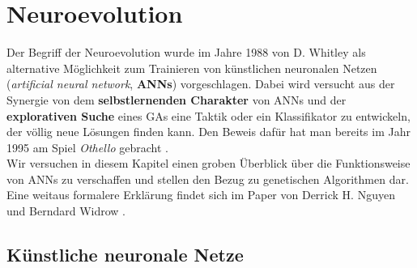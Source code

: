    \section{Neuroevolution} \label{neural-evo-definition}
        Der Begriff der Neuroevolution wurde im Jahre 1988 von D. Whitley \cite{whitley88} als alternative Möglichkeit zum Trainieren von künstlichen neuronalen Netzen (\textit{artificial neural network}, \textbf{ANNs}) vorgeschlagen. Dabei wird versucht aus der Synergie von dem \textbf{selbstlernenden Charakter} von ANNs und der \textbf{explorativen Suche} eines GAs eine Taktik oder ein Klassifikator zu entwickeln, der völlig neue Lösungen finden kann. Den Beweis dafür hat man bereits im Jahr 1995 am Spiel \textit{Othello} gebracht \cite{othello95}. \\[2mm]
        \noindent
        Wir versuchen in diesem Kapitel einen groben Überblick über die Funktionsweise von ANNs zu verschaffen und stellen den Bezug zu genetischen Algorithmen dar. Eine weitaus formalere Erklärung findet sich im Paper von Derrick H. Nguyen und Berndard Widrow \cite{neuralnetwork-overview}.

        \subsection{Künstliche neuronale Netze}

